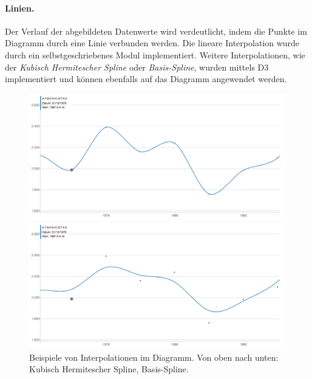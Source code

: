 \paragraph{Linien.} Der Verlauf der abgebildeten Datenwerte wird verdeutlicht, indem die Punkte im Diagramm durch eine Linie verbunden werden. Die lineare Interpolation wurde durch ein selbstgeschriebenes Modul implementiert. Weitere Interpolationen, wie der \textit{Kubisch Hermitescher Spline} oder \textit{Basis-Spline}, wurden mittels D3 implementiert und können ebenfalls auf das Diagramm angewendet werden.

\begin{figure}[!htbp]
	\begin{minipage}{\textwidth}
		\centering
		\includegraphics[width=\linewidth]{images/cardinal}
	\end{minipage}
	\begin{minipage}{\textwidth}
		\centering
		\includegraphics[width=\linewidth]{images/basis}
	\end{minipage}
	\caption[Beispiele von Interpolationen und Zoom]{Beispiele von Interpolationen im Diagramm. Von oben nach unten: Kubisch Hermitescher Spline, Basis-Spline.}
	\label{fig:vergleich}
\end{figure}

